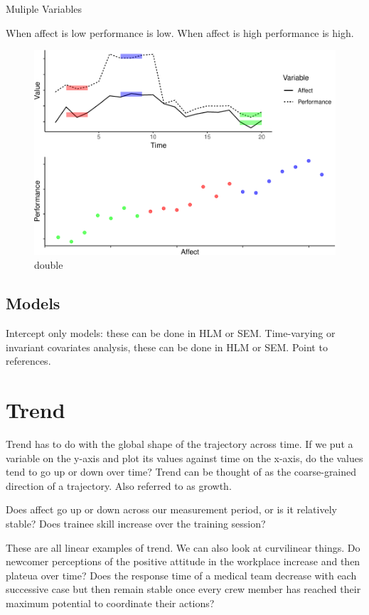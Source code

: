 \documentclass[english,,man]{apa6}
\theoremstyle{definition}
\theoremstyle{definition}
\theoremstyle{definition}
\theoremstyle{remark}
\begin{document}
Muliple Variables

When affect is low performance is low. When affect is high performance
is high.

\begin{figure}
\centering
\includegraphics{figures/unnamed-chunk-9-1.pdf}
\caption{\label{fig:unnamed-chunk-9}double\label{level_relation}}
\end{figure}

\hypertarget{models}{%
\subsection{Models}\label{models}}

Intercept only models: these can be done in HLM or SEM. Time-varying or
invariant covariates analysis, these can be done in HLM or SEM. Point to
references.

\hypertarget{trend}{%
\section{Trend}\label{trend}}

Trend has to do with the global shape of the trajectory across time. If
we put a variable on the y-axis and plot its values against time on the
x-axis, do the values tend to go up or down over time? Trend can be
thought of as the coarse-grained direction of a trajectory. Also
referred to as growth.

Does affect go up or down across our measurement period, or is it
relatively stable? Does trainee skill increase over the training
session?

These are all linear examples of trend. We can also look at curvilinear
things. Do newcomer perceptions of the positive attitude in the
workplace increase and then plateua over time? Does the response time of
a medical team decrease with each successive case but then remain stable
once every crew member has reached their maximum potential to coordinate
their actions?
\end{document}
